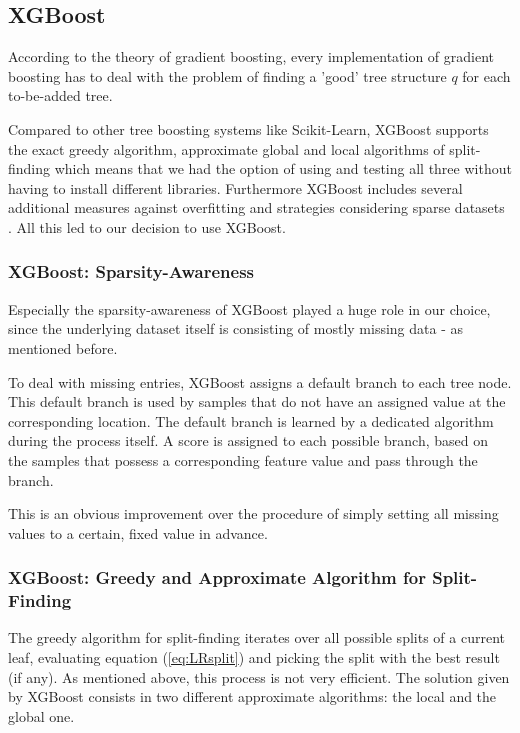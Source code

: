 \subsection{XGBoost}\label{subsec:xgb}

According to the theory of gradient boosting, every implementation of gradient boosting has to deal with the problem of finding a 'good' tree structure $q$ for each to-be-added tree.

Compared to other tree boosting systems like Scikit-Learn, XGBoost supports the exact greedy algorithm, approximate global and local algorithms of split-finding which means that we had the option of using and testing all three without having to install different libraries. Furthermore XGBoost includes several additional measures against overfitting and strategies considering sparse datasets \cite{Chen16}. All this led to our decision to use XGBoost.

\subsubsection{XGBoost: Sparsity-Awareness}

Especially the sparsity-awareness of XGBoost played a huge role in our choice, since the underlying dataset itself is consisting of mostly missing data - as mentioned before.

To deal with missing entries, XGBoost assigns a default branch to each tree node. This default branch is used by samples that do not have an assigned value at the corresponding location. The default branch is learned by a dedicated algorithm during the process itself. A score is assigned to each possible branch, based on the samples that possess a corresponding feature value and pass through the branch.

This is an obvious improvement over the procedure of simply setting all missing values to a certain, fixed value in advance.

\subsubsection{XGBoost: Greedy and Approximate Algorithm for Split-Finding}
The greedy algorithm for split-finding iterates over all possible splits of a current leaf, evaluating equation (\ref{eq:LRsplit}) and picking the split with the best result (if any). As mentioned above, this process is not very efficient. The solution given by XGBoost consists in two different approximate algorithms: the local and the global one.

